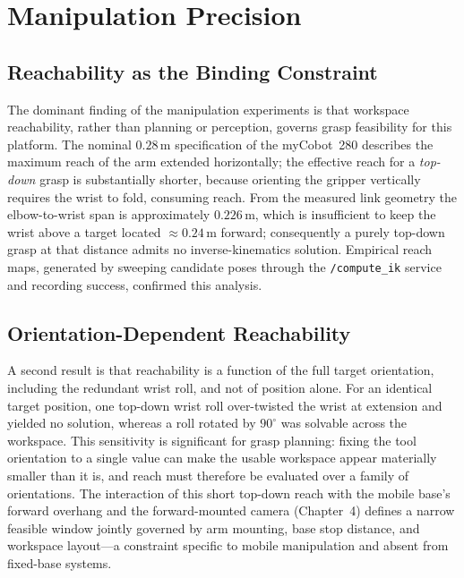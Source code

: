 \section{Manipulation Precision}

\subsection{Reachability as the Binding Constraint}
The dominant finding of the manipulation experiments is that workspace reachability,
rather than planning or perception, governs grasp feasibility for this platform. The
nominal $0.28$\,m specification of the myCobot~280 describes the maximum reach of the
arm extended horizontally; the effective reach for a \emph{top-down} grasp is
substantially shorter, because orienting the gripper vertically requires the wrist to
fold, consuming reach. From the measured link geometry the elbow-to-wrist span is
approximately $0.226$\,m, which is insufficient to keep the wrist above a target
located $\approx 0.24$\,m forward; consequently a purely top-down grasp at that
distance admits no inverse-kinematics solution. Empirical reach maps, generated by
sweeping candidate poses through the \texttt{/compute\_ik} service and recording
success, confirmed this analysis.

\subsection{Orientation-Dependent Reachability}
A second result is that reachability is a function of the full target orientation,
including the redundant wrist roll, and not of position alone. For an identical target
position, one top-down wrist roll over-twisted the wrist at extension and yielded no
solution, whereas a roll rotated by $90^{\circ}$ was solvable across the workspace.
This sensitivity is significant for grasp planning: fixing the tool orientation to a
single value can make the usable workspace appear materially smaller than it is, and
reach must therefore be evaluated over a family of orientations. The interaction of
this short top-down reach with the mobile base's forward overhang and the
forward-mounted camera (Chapter~4) defines a narrow feasible window jointly governed by
arm mounting, base stop distance, and workspace layout---a constraint specific to
mobile manipulation and absent from fixed-base systems.

